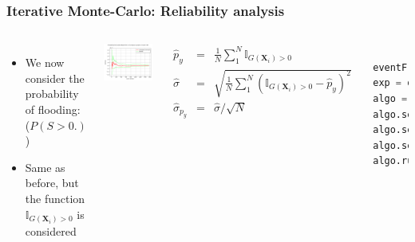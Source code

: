 \documentclass{beamer}
\renewcommand{\footnotesize}{\tiny}
\begin{document}

\begin{frame}[containsverbatim]
\frametitle{Iterative Monte-Carlo: Reliability analysis}

\scriptsize{

\begin{columns}

\begin{itemize}
\item We now consider the probability of flooding:  ($P(S>0.)$) 
\item Same as before, but the function $\mathbb{I}_{G(\mathbf{X}_i)>0} $ is considered
\end{itemize}

    \includegraphics[width=1.\textwidth]{figures/Probability.png}

 
    
 \footnotesize
\begin{eqnarray*}
\widehat{p}_y & = & \frac{1}{N}\sum_1^N \mathbb{I}_{G(\mathbf{X}_i)>0} \\
\widehat{\sigma}  & = & \sqrt{\frac{1}{N}\sum_1^N (\mathbb{I}_{G(\mathbf{X}_i)>0}-\hat{p}_y)^2} \\
\widehat{\sigma}_{p_y} & = & \widehat{\sigma} / \sqrt{N}
\end{eqnarray*}

\tiny 
\begin{lstlisting}[language=Python, numbers = none]

eventF = ot.ThresholdEvent(outputVector, ot.GreaterOrEqual(), 0.0)
exp = ot.MonteCarloExperiment()
algo = ot.ProbabilitySimulationAlgorithm(eventF, exp)
algo.setMaximumOuterSampling(100000)
algo.setMaximumCoefficientOfVariation(0.01)
algo.setBlockSize(10)
algo.run()


\end{lstlisting}

	
\end{columns}

}

\end{frame}
\end{document}
